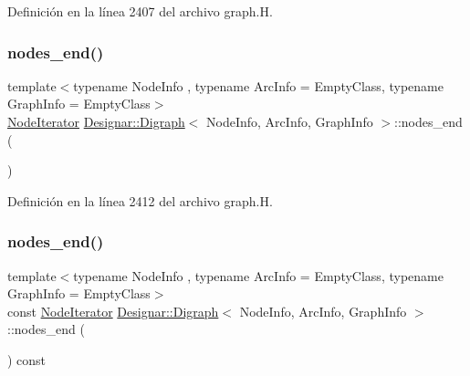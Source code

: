 Definición en la línea 2407 del archivo graph.\+H.

\mbox{\label{class_designar_1_1_digraph_a67917506d721e541955aa2a639b94759}} 
\subsubsection{\texorpdfstring{nodes\+\_\+end()}{nodes\_end()}\hspace{0.1cm}{\footnotesize\ttfamily [1/2]}}
{\footnotesize\ttfamily template$<$typename Node\+Info , typename Arc\+Info  = Empty\+Class, typename Graph\+Info  = Empty\+Class$>$ \\
\hyperlink{class_designar_1_1_digraph_1_1_node_iterator}{Node\+Iterator} \hyperlink{class_designar_1_1_digraph}{Designar\+::\+Digraph}$<$ Node\+Info, Arc\+Info, Graph\+Info $>$\+::nodes\+\_\+end (\begin{DoxyParamCaption}{ }\end{DoxyParamCaption})\hspace{0.3cm}{\ttfamily [inline]}}



Definición en la línea 2412 del archivo graph.\+H.

\mbox{\label{class_designar_1_1_digraph_a82c01284de2fc81c7bd04c13d8861d9a}} 
\subsubsection{\texorpdfstring{nodes\+\_\+end()}{nodes\_end()}\hspace{0.1cm}{\footnotesize\ttfamily [2/2]}}
{\footnotesize\ttfamily template$<$typename Node\+Info , typename Arc\+Info  = Empty\+Class, typename Graph\+Info  = Empty\+Class$>$ \\
const \hyperlink{class_designar_1_1_digraph_1_1_node_iterator}{Node\+Iterator} \hyperlink{class_designar_1_1_digraph}{Designar\+::\+Digraph}$<$ Node\+Info, Arc\+Info, Graph\+Info $>$\+::nodes\+\_\+end (\begin{DoxyParamCaption}{ }\end{DoxyParamCaption}) const\hspace{0.3cm}{\ttfamily [inline]}}



